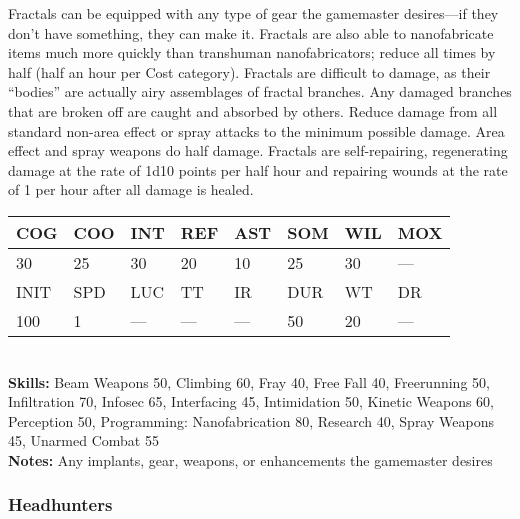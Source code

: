 Fractals can be equipped with any type of gear the gamemaster desires—if they don't have something, they can make it. Fractals are also able to nanofabricate items much more quickly than transhuman nanofabricators; reduce all times by half (half an hour per Cost category). Fractals are difficult to damage, as their ``bodies'' are actually airy assemblages of fractal branches. Any damaged branches that are broken off are caught and absorbed by others. Reduce damage from all standard non-area effect or spray attacks to the minimum possible damage. Area effect and spray weapons do half damage. Fractals are self-repairing, regenerating damage at the rate of 1d10 points per half hour and repairing wounds at the rate of 1 per hour after all damage is healed. \\ \begin{tabular}{|l|l|l|l|l|l|l|l|} \hline

COG &COO &INT &REF &AST &SOM &WIL &MOX \\ \hline

30 &25 &30 &20 &10 &25 &30 &— \\ \hline

INIT &SPD &LUC &TT &IR &DUR &WT &DR \\ \hline

100 &1 &— &— &— &50 &20 &— \\ \hline

\end{tabular} \\ \textbf{Skills:} Beam Weapons 50, Climbing 60, Fray 40, Free Fall 40, Freerunning 50, Infiltration 70, Infosec 65, Interfacing 45, Intimidation 50, Kinetic Weapons 60, Perception 50, Programming: Nanofabrication 80, Research 40, Spray Weapons 45, Unarmed Combat 55 \\ \textbf{Notes:} Any implants, gear, weapons, or enhancements the gamemaster desires 



\subsubsection{Headhunters} 

